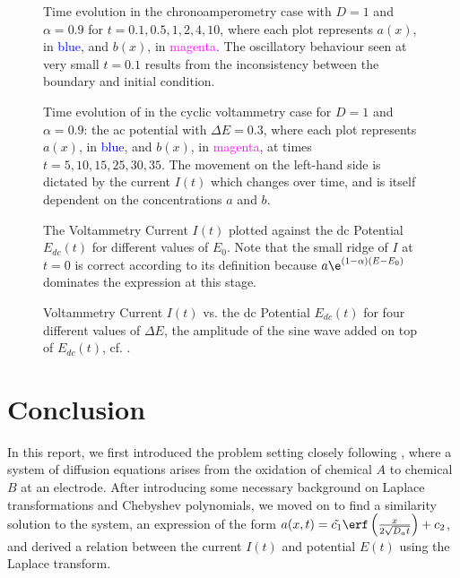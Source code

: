 \documentclass{prettytex/ox/mmsc-special-topic}
\begin{document}
  \begin{figure}[H]
    \centering
    \caption{Time evolution in the chronoamperometry case with $D=1$ and $\alpha = 0.9$ for $t = 0.1, 0.5, 1, 2, 4, 10$, where each plot represents $a(x)$, in \textcolor{blue}{blue}, and $b(x)$, in \textcolor{magenta}{magenta}. The oscillatory behaviour seen at very small $t = 0.1$ results from the inconsistency between the boundary and initial condition.}
    \label{fig:chronoamperometry}
  \end{figure}

  \begin{figure}[H]
    \centering
    \caption{Time evolution of in the cyclic voltammetry case for $D=1$ and $\alpha = 0.9$: the \gls{ac} potential with $\Delta E = 0.3$, where each plot represents $a(x)$, in \textcolor{blue}{blue}, and $b(x)$, in \textcolor{magenta}{magenta}, at times $t = 5, 10, 15, 25, 30, 35$. The movement on the left-hand side is dictated by the current $I(t)$ which changes over time, and is itself dependent on the concentrations $a$ and $b$.}
    \label{fig:ac-voltammetry}
  \end{figure}

  \begin{figure}[H]
    \centering
    \caption{The Voltammetry Current $I(t)$ plotted against the \gls{dc} Potential $E_{dc}(t)$ for different values of $E_0$. Note that the small ridge of $I$ at $t = 0$ is correct according to its definition because $a \e^{(1-\alpha)(E - E_0)}$ dominates the expression at this stage.}
    \label{fig:different-E0s}
  \end{figure}

  \begin{figure}[H]
    \centering
    \caption{Voltammetry Current $I(t)$ vs. the \gls{dc} Potential $E_{dc}(t)$ for four different values of $\Delta E$, the amplitude of the sine wave added on top of $E_{dc}(t)$, cf. .}
    \label{fig:voltammetry-current}
  \end{figure}

  \section{Conclusion}
  In this report, we first introduced the problem setting closely following \cite{Gavaghan2000Jan}, where a system of diffusion equations arises from the oxidation of chemical $A$ to chemical $B$ at an electrode.
  After introducing some necessary background on Laplace transformations and Chebyshev polynomials, we moved on to find a similarity solution to the system, an expression of the form $a(x, t) = \tilde{c_1} \erf\left(\frac{x}{2\sqrt{D_a t}}\right) + c_2$, and derived a relation between the current $I(t)$ and potential $E(t)$ using the Laplace transform.
\end{document}
